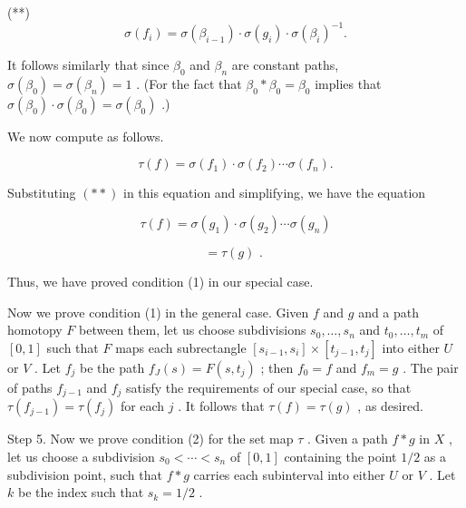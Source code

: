 (**)
\[
\sigma \left( {f}_{i}\right)  = \sigma \left( {\beta }_{i - 1}\right)  \cdot  \sigma \left( {g}_{i}\right)  \cdot  \sigma {\left( {\beta }_{i}\right) }^{-1}.
\]

It follows similarly that since \({\beta }_{0}\) and \({\beta }_{n}\) are constant paths, \(\sigma \left( {\beta }_{0}\right)  = \sigma \left( {\beta }_{n}\right)  = 1\) . (For the fact that \({\beta }_{0} * {\beta }_{0} = {\beta }_{0}\) implies that \(\sigma \left( {\beta }_{0}\right)  \cdot  \sigma \left( {\beta }_{0}\right)  = \sigma \left( {\beta }_{0}\right)\) .)

We now compute as follows.

\[
\tau \left( f\right)  = \sigma \left( {f}_{1}\right)  \cdot  \sigma \left( {f}_{2}\right) \cdots \sigma \left( {f}_{n}\right) .
\]

Substituting \(\left( {* * }\right)\) in this equation and simplifying, we have the equation

\[
\tau \left( f\right)  = \sigma \left( {g}_{1}\right)  \cdot  \sigma \left( {g}_{2}\right) \cdots \sigma \left( {g}_{n}\right)
\]

\[
= \tau \left( g\right) \text{ . }
\]

Thus, we have proved condition (1) in our special case.

Now we prove condition (1) in the general case. Given \(f\) and \(g\) and a path homotopy \(F\) between them, let us choose subdivisions \({s}_{0},\ldots ,{s}_{n}\) and \({t}_{0},\ldots ,{t}_{m}\) of \(\left\lbrack  {0,1}\right\rbrack\) such that \(F\) maps each subrectangle \(\left\lbrack  {{s}_{i - 1},{s}_{i}}\right\rbrack   \times  \left\lbrack  {{t}_{j - 1},{t}_{j}}\right\rbrack\) into either \(U\) or \(V\) . Let \({f}_{j}\) be the path \({f}_{J}\left( s\right)  = F\left( {s,{t}_{j}}\right)\) ; then \({f}_{0} = f\) and \({f}_{m} = g\) . The pair of paths \({f}_{j - 1}\) and \({f}_{j}\) satisfy the requirements of our special case, so that \(\tau \left( {f}_{j - 1}\right)  = \tau \left( {f}_{j}\right)\) for each \(j\) . It follows that \(\tau \left( f\right)  = \tau \left( g\right)\) , as desired.

Step 5. Now we prove condition (2) for the set map \(\tau\) . Given a path \(f * g\) in \(X\) , let us choose a subdivision \({s}_{0} < \cdots  < {s}_{n}\) of \(\left\lbrack  {0,1}\right\rbrack\) containing the point \(1/2\) as a subdivision point, such that \(f * g\) carries each subinterval into either \(U\) or \(V\) . Let \(k\) be the index such that \({s}_{k} = 1/2\) .

